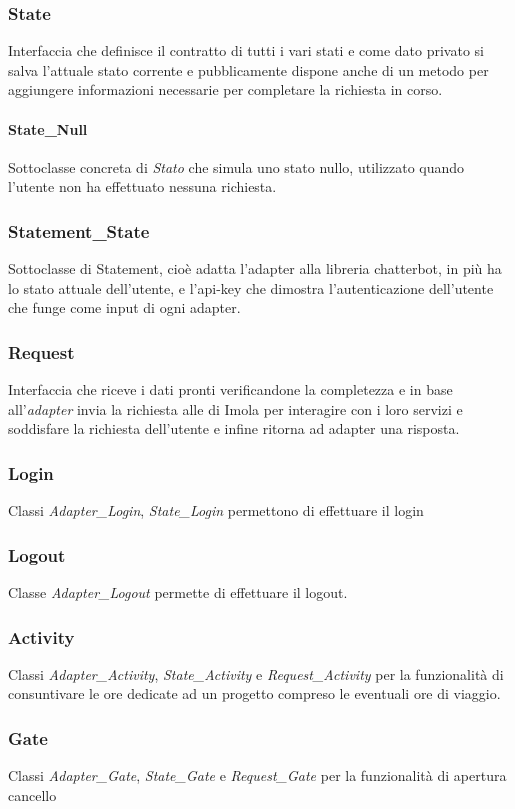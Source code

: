 \subsubsection{State} Interfaccia che definisce il contratto di tutti i vari stati e come dato privato si salva l'attuale stato corrente e pubblicamente dispone anche di un metodo per aggiungere informazioni necessarie per completare la richiesta in corso.
\paragraph*{State\_Null} Sottoclasse concreta di \textit{Stato} che simula uno stato nullo, utilizzato quando l'utente non ha effettuato nessuna richiesta.
\subsubsection{Statement\_State} Sottoclasse di Statement, cioè adatta l'adapter alla libreria chatterbot, in più ha lo stato attuale dell'utente, e l'api-key che dimostra l'autenticazione dell'utente che funge come input di ogni adapter.
\subsubsection{Request} Interfaccia che riceve i dati pronti verificandone la completezza e in base all'\textit{adapter} invia la richiesta  alle  di Imola per interagire con i loro servizi e soddisfare la richiesta dell'utente e infine ritorna ad adapter una risposta.
\subsubsection{Login} Classi \textit{Adapter\_Login}, \textit{State\_Login} permettono di effettuare il login
\subsubsection{Logout} Classe \textit{Adapter\_Logout} permette di effettuare il logout.
\subsubsection{Activity} Classi \textit{Adapter\_Activity}, \textit{State\_Activity} e \textit{Request\_Activity} per la funzionalità di consuntivare le ore dedicate ad un progetto compreso le eventuali ore di viaggio.
\subsubsection{Gate} Classi \textit{Adapter\_Gate}, \textit{State\_Gate} e \textit{Request\_Gate} per la funzionalità di apertura cancello
